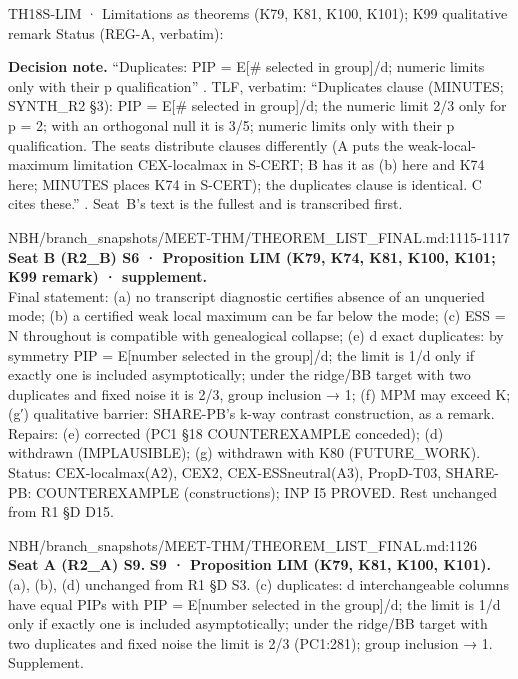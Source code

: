 \begin{card}{TH18}{S-LIM · Limitations as theorems (K79, K81, K100, K101); K99 qualitative remark}
\approvedFB\quad Status (REG-A, verbatim):  

\textbf{Decision note.} ``Duplicates: PIP = E[\# selected in group]/d; numeric limits only with their p qualification'' . TLF, verbatim: ``Duplicates clause (MINUTES; SYNTH\_R2 §3): PIP = E[\# selected in group]/d; the numeric limit 2/3 only for p = 2; with an orthogonal null it is 3/5; numeric limits only with their p qualification. The seats distribute clauses differently (A puts the weak-local-maximum limitation CEX-localmax in S-CERT; B has it as (b) here and K74 here; MINUTES places K74 in S-CERT); the duplicates clause is identical. C cites these.'' . Seat~B's text is the fullest and is transcribed first.

\begin{stmt}{NBH/branch_snapshots/MEET-THM/THEOREM_LIST_FINAL.md:1115-1117}
\textbf{Seat B (R2\_B) S6 · Proposition LIM (K79, K74, K81, K100, K101; K99 remark) · supplement.}\\
Final statement: (a) no transcript diagnostic certifies absence of an unqueried mode; (b) a certified weak local maximum can be far below the mode; (c) ESS = N throughout is compatible with genealogical collapse; (e) d exact duplicates: by symmetry PIP = E[number selected in the group]/d; the limit is 1/d only if exactly one is included asymptotically; under the ridge/BB target with two duplicates and fixed noise it is 2/3, group inclusion → 1; (f) MPM may exceed K; (g′) qualitative barrier: SHARE-PB's k-way contrast construction, as a remark. Repairs: (e) corrected (PC1 §18 COUNTEREXAMPLE conceded); (d) withdrawn (IMPLAUSIBLE); (g) withdrawn with K80 (FUTURE\_WORK). Status: CEX-localmax(A2), CEX2, CEX-ESSneutral(A3), PropD-T03, SHARE-PB: COUNTEREXAMPLE (constructions); INP I5 PROVED. Rest unchanged from R1 §D D15.
\end{stmt}

\begin{stmt}{NBH/branch_snapshots/MEET-THM/THEOREM_LIST_FINAL.md:1126}
\textbf{Seat A (R2\_A) S9.} \textbf{S9 · Proposition LIM (K79, K81, K100, K101).} (a), (b), (d) unchanged from R1 §D S3. (c) duplicates: d interchangeable columns have equal PIPs with PIP = E[number selected in the group]/d; the limit is 1/d only if exactly one is included asymptotically; under the ridge/BB target with two duplicates and fixed noise the limit is 2/3 (PC1:281); group inclusion → 1. Supplement.
\end{stmt}


\end{card}
